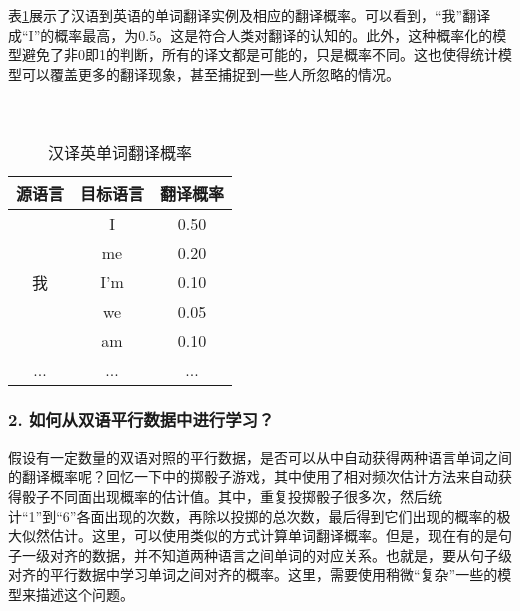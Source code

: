 \parinterval 表\ref{tab:5-1}展示了汉语到英语的单词翻译实例及相应的翻译概率。可以看到，“我”翻译成“I”的概率最高，为0.5。这是符合人类对翻译的认知的。此外，这种概率化的模型避免了非0即1的判断，所有的译文都是可能的，只是概率不同。这也使得统计模型可以覆盖更多的翻译现象，甚至捕捉到一些人所忽略的情况。\\ \\ \\
\begin{table}[htp]
    \centering
    \begin{tabular}{c | c  c}
    源语言 & 目标语言 & 翻译概率 \\ \hline
                & I              & 0.50 \\
                & me          & 0.20 \\
    我        & I'm          & 0.10 \\
                & we          & 0.05 \\
                & am         & 0.10 \\
    ...         & ...           & ... \\
    \end{tabular}
    \caption{汉译英单词翻译概率}
    \label{tab:5-1}
\end{table}


\subsubsection{2. 如何从双语平行数据中进行学习？}

\parinterval 假设有一定数量的双语对照的平行数据，是否可以从中自动获得两种语言单词之间的翻译概率呢？回忆一下{\chaptertwo}中的掷骰子游戏，其中使用了相对频次估计方法来自动获得骰子不同面出现概率的估计值。其中，重复投掷骰子很多次，然后统计“1”到“6”各面出现的次数，再除以投掷的总次数，最后得到它们出现的概率的极大似然估计。这里，可以使用类似的方式计算单词翻译概率。但是，现在有的是句子一级对齐的数据，并不知道两种语言之间单词的对应关系。也就是，要从句子级对齐的平行数据中学习单词之间对齐的概率。这里，需要使用稍微“复杂”一些的模型来描述这个问题。

